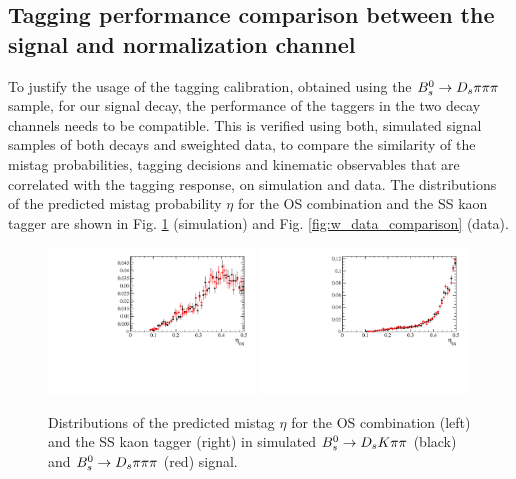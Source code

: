 \subsection{Tagging performance comparison between the signal and normalization channel}
\label{subsec: TaggingComparison}

To justify the usage of the tagging calibration, obtained using the ${{B}^0_{s}}\rightarrow{\ensuremath{{D}_{s}}}{\ensuremath{\pi}}{\ensuremath{\pi}}{\ensuremath{\pi}}$ sample, for our signal decay, the performance of the taggers in the two decay channels needs to be compatible. 
This is verified using both, simulated signal samples of both decays and sweighted data, 
to compare the similarity of the mistag probabilities, tagging decisions and kinematic observables that are correlated with the tagging response, on simulation and data.  \newline
The distributions of the predicted mistag probability $\eta$ for the OS combination and the SS kaon tagger are shown in Fig. \ref{fig:w_MC_comparison} (simulation) and Fig. \ref{fig:w_data_comparison} (data).
 


\begin{figure}[h]
\includegraphics[height=7.cm,width=0.49\textwidth]{figs/Tagging/w_OS_MC.pdf}
\includegraphics[height=7.cm,width=0.49\textwidth]{figs/Tagging/w_SS_MC.pdf}
\caption{Distributions of the predicted mistag $\eta$ for the OS combination (left) and the SS kaon tagger (right) in simulated ${{B}^0_{s}}\rightarrow{\ensuremath{{D}_{s}}}{\ensuremath{K}}{\ensuremath{\pi}}{\ensuremath{\pi}}$ (black) and ${{B}^0_{s}}\rightarrow{\ensuremath{{D}_{s}}}{\ensuremath{\pi}}{\ensuremath{\pi}}{\ensuremath{\pi}}$ (red) signal.}
\label{fig:w_MC_comparison}
\end{figure}


